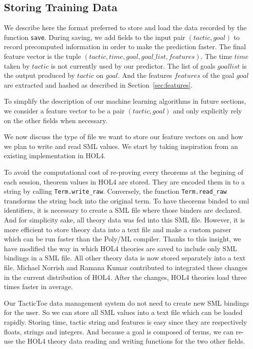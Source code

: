 \documentclass[runningheads,a4paper,draft]{svjour3}
\def\holfour{\textsf{HOL4}\xspace}
\def\sml{\textsf{SML}\xspace}
\def\polyml{\textsf{Poly/ML}\xspace}
\def\tactictoe{\textsf{TacticToe}\xspace}
\begin{document}
\subsection{Storing Training Data}
We describe here the format preferred to store and load the 
data recorded by the function \texttt{save}. 
During saving, we add fields to the input pair $(tactic,goal)$ to record 
precomputed information in order to make the prediction faster. The final 
feature vector is the tuple $(tactic,time,goal,goal\_list,features)$.
The time $time$ taken by $tactic$ is not currently used by our 
predictor. The list of goals $goal list$ is the output produced by $tactic$ on 
$goal$. And the features $features$ of the goal $goal$ are extracted and hashed 
as described in Section~\ref{sec:features}. 

\begin{remark}
To simplify the description of our machine learning algorithms in future 
sections, we consider a feature vector to be a pair $(tactic,goal)$ and only 
explicitly rely on the 
other fields when necessary.
\end{remark}

We now discuss the type of file we want to store our feature vectors on and
how we plan to write and read \sml values. We start by taking 
inspiration from an existing implementation in \holfour.

To avoid the computational cost of re-proving every theorems at the begining of 
each session, theorem values in \holfour are stored.
They are encoded them in to a string by calling \texttt{Term.write\_raw}.
Conversely, the function \texttt{Term.read\_raw} transforms the string back 
into the original term.
To have theorems binded to sml identifiers, it is necessary to create a 
\sml file where those binders are declared. And for simplicity sake, all theory 
data was fed into this \sml file. However, it is
more efficient to store theory data into a text file and make a custom 
parser which can be run faster than the \polyml compiler.
Thanks to this insight, we have 
modified the way in which \holfour theories are saved to include only \sml 
bindings in a \sml file. All other theory data is now stored separately 
into a text file. Michael Norrish and Ramana Kumar contributed to integrated 
these changes in the current distribution of \holfour. After the changes, 
\holfour theories load three times faster in average.

Our \tactictoe data management system do not need to create new \sml
bindings for the user. So we can store all \sml values into a text file which 
can be loaded rapidly.
Storing time, tactic string and features is easy since they are respectively 
floats, strings and integers. And because a goal is composed of terms, we can 
re-use the \holfour theory data reading and writing functions 
for the two other fields.
\end{document}
